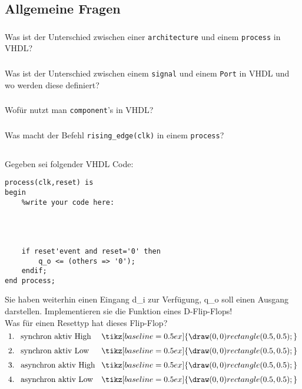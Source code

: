 \subsection{Allgemeine Fragen}
\subsubsection{}
Was ist der Unterschied zwischen einer \texttt{architecture} und einem \texttt{process} in VHDL?\\
\noindent
\subsubsection{}
Was ist der Unterschied zwischen einem \texttt{signal} und einem \texttt{Port} in VHDL und wo werden diese definiert?\\[0.1cm]
\noindent
\subsubsection{}
Wofür nutzt man \texttt{component}'s in VHDL?\\
\noindent
\subsubsection{}
Was macht der Befehl \texttt{rising_edge(clk)} in einem \texttt{process}?\\
\noindent
\subsection{}
Gegeben sei folgender VHDL Code:
\begin{verbatim}
process(clk,reset) is
begin
	%write your code here:
	
	
	
	
	if reset'event and reset='0' then
		q_o <= (others => '0');
	endif;
end process;
\end{verbatim}
Sie haben weiterhin einen Eingang d\_i zur Verfügung, q\_o soll einen Ausgang darstellen.
Implementieren sie die Funktion eines D-Flip-Flops!\\
Was für einen Resettyp hat dieses Flip-Flop?\\[0.3cm]
$
\arraycolsep=4pt\def\arraystretch{1.5}
\begin{array}{r l l}
	1.&\text{synchron aktiv High} &\tikz[baseline=0.5ex]{\draw (0,0) rectangle (0.5,0.5);}\\
	2.&\text{synchron aktiv Low} &\tikz[baseline=0.5ex]{\draw (0,0) rectangle (0.5,0.5);}\\
	3.&\text{asynchron aktiv High} &\tikz[baseline=0.5ex]{\draw (0,0) rectangle (0.5,0.5);}\\
	4.&\text{asynchron aktiv Low} &\tikz[baseline=0.5ex]{\draw (0,0) rectangle (0.5,0.5);}\\
\end{array}$